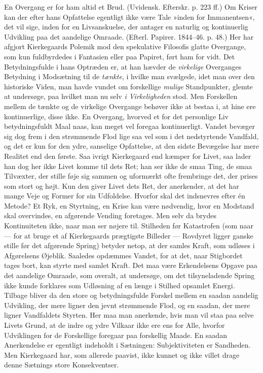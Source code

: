 \documentclass[12pt,a4paper,openany]{book}
\newcommand{\opage}[1]{\marginnote{\footnotesize\textit{[#1]}}}
\begin{document}
En Overgang er for ham altid et Brud. (Uvidensk.
Efterskr. p. 223 ff.) Om Kriser kan der efter hans
Opfattelse egentligt ikke være Tale »inden for Immanentsen«,
det vil sige, inden for en Livsanskuelse, der
antager en naturlig og kontinuerlig Udvikling paa det
aandelige Omraade. (Efterl. Papirer. 1844--46. p. 48.)
Her har afgjort Kierkegaards Polemik mod den spekulative
Filosofis glatte Overgange, som kun fuldbyrdedes i
Fantasien eller paa Papiret, ført ham for vidt. Det Betydningsfulde
i hans Optræden er, at han hævder de
\textit{virkelige} Overganges Betydning i Modsætning til de
\textit{tænkte}, i hvilke man svælgede, idet man over den historiske
Viden, man havde vundet om forskellige \textit{mulige}
Standpunkter, glemte at undersøge, paa hvilket man nu
selv \textit{i Virkeligheden} stod. Men Forskellen mellem de
tænkte og de virkelige Overgange behøver ikke at bestaa
i, at hine ere kontinuerlige, disse ikke. En Overgang,
hvorved et for det personlige Liv betydningsfuldt Maal
naas, kan meget vel foregaa kontinuerligt. Vandet bevæger
sig dog frem i den strømmende Flod lige saa vel
som i det nedstyrtende Vandfald, og det er kun for den
ydre, sanselige Opfattelse, at den sidste Bevægelse har
mere Realitet end den første. Saa ivrigt Kierkegaard
end kæmper for Livet, saa lader han dog her ikke Livet
komme til dets Ret; han ser ikke de smaa Ting, de
smaa Tilvæxter, der stille føje sig sammen og uformærkt
ofte frembringe det, der prises som stort og højt. Kun
den giver Livet dets Ret, der anerkender, at det har
mange Veje og Former for sin Udfoldelse. Hvorfor skal
det indsnevres efter én Metode? Et Ryk, en Styrtning,
en Krise kan være nødvendig, hvor en Modstand skal
overvindes, en afgørende Vending foretages. Men selv da
\opage{122}brydes Kontinuiteten ikke, naar man ser nøjere til.
Stilheden før Katastrofen (som naar --- for at bruge et
af Kierkegaards prægtigste Billeder --- Rovdyret ligger
ganske stille før det afgørende Spring) betyder netop, at
der samles Kraft, som udløses i Afgørelsens Øjeblik.
Saaledes opdæmmes Vandet, for at det, naar Stigbordet
tages bort, kan styrte med samlet Kraft. Det maa være
Erkendelsens Opgave paa det aandelige Omraade, som
overalt, at undersøge, om det tilsyneladende Spring ikke
kunde forklares som Udløsning af en længe i Stilhed opsamlet
Energi. Tilbage bliver da den store og betydningsfulde
Forskel mellem en saadan aandelig Udvikling, der
mere ligner den jevnt strømmende Flod, og en saadan,
der mere ligner Vandfaldets Styrten. Her maa man
anerkende, hvis man vil staa paa selve Livets Grund, at
de indre og ydre Vilkaar ikke ere ens for Alle, hvorfor
Udviklingen for de Forskellige foregaar paa forskellig
Maade. En saadan Anerkendelse er egentligt indeholdt
i Sætningen: Subjektiviteten er Sandheden. Men Kierkegaard
har, som allerede paavist, ikke kunnet og ikke
villet drage denne Sætnings store Konsekventser.
\end{document}
